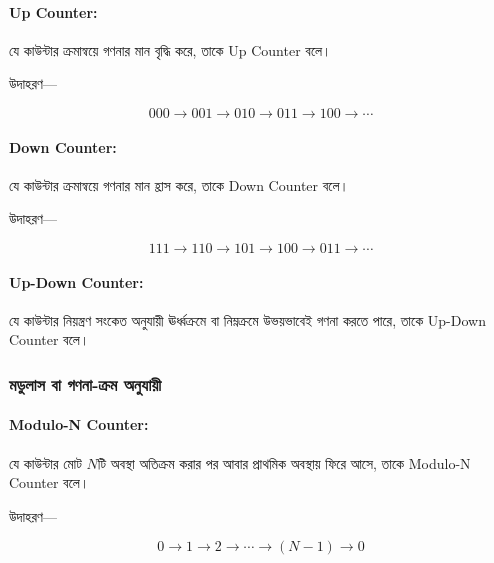 \paragraph{\textenglish{Up Counter}:}

যে কাউন্টার ক্রমান্বয়ে গণনার মান বৃদ্ধি করে,
তাকে \textenglish{Up Counter} বলে।

উদাহরণ—

\[
000\rightarrow001\rightarrow010\rightarrow011
\rightarrow100\rightarrow\cdots
\]

\paragraph{\textenglish{Down Counter}:}

যে কাউন্টার ক্রমান্বয়ে গণনার মান হ্রাস করে,
তাকে \textenglish{Down Counter} বলে।

উদাহরণ—

\[
111\rightarrow110\rightarrow101\rightarrow100
\rightarrow011\rightarrow\cdots
\]

\paragraph{\textenglish{Up-Down Counter}:}

যে কাউন্টার নিয়ন্ত্রণ সংকেত অনুযায়ী ঊর্ধ্বক্রমে বা নিম্নক্রমে
উভয়ভাবেই গণনা করতে পারে,
তাকে \textenglish{Up-Down Counter} বলে।



\subsubsection*{মডুলাস বা গণনা-ক্রম অনুযায়ী}

\paragraph{\textenglish{Modulo-N Counter}:}

যে কাউন্টার মোট \(N\)টি অবস্থা অতিক্রম করার পর আবার
প্রাথমিক অবস্থায় ফিরে আসে,
তাকে \textenglish{Modulo-N Counter} বলে।

উদাহরণ—

\[
0\rightarrow1\rightarrow2\rightarrow\cdots
\rightarrow(N-1)\rightarrow0
\]



